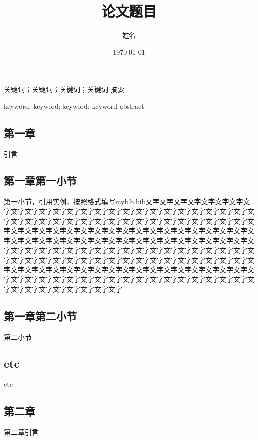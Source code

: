 \documentclass[twoside]{CUGThesis}
\title{论文题目} %
\author{姓名} %
\date{\today} %
\begin{document}
	\maketitle
	\makestatement
	
	\begin{cnabstract}{关键词；关键词；关键词；关键词}
		摘要
	\end{cnabstract}
	
	\begin{enabstract}{keyword; keyword; keyword; keyword}
		abstract
	\end{enabstract}
	
	\makeToc
	
	
	\begin{spacing}{2}
		\section{第一章}
	\end{spacing}
	引言
	\subsection{第一章第一小节}
	第一小节，引用实例\cite{引用}，按照格式填写mybib.bib文字文字文字文字文字文字文字文字文字文字文字文字文字文字文字文字文字文字文字文字文字文字文字文字文字文字文字文字文字文字文字文字文字文字文字文字文字文字文字文字文字文字文字文字文字文字文字文字文字文字文字文字文字文字文字文字文字文字文字文字文字文字文字文字文字文字文字文字文字文字文字文字文字文字文字文字文字文字文字文字文字文字文字文字文字文字文字文字文字文字文字文字文字文字文字文字文字文字文字文字文字文字文字文字文字文字文字文字文字文字文字文字文字文字文字文字文字文字文字文字文字文字文字文字文字文字文字文字文字文字文字文字文字文字文字文字文字文字文字文字文字文字文字文字文字文字文字文字文字文字文字文字文字文字文字文字文字文字文字文字
	\subsection{第一章第二小节}
	第二小节
	\subsection{etc}
	etc
	
	
	\begin{spacing}{2}
		\section{第二章}
	\end{spacing}
	第二章引言
\end{document}
